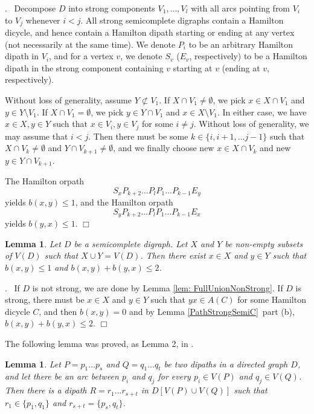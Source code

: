 \documentclass{article}
\newcommand{\2}{\vspace{2mm}}
\renewenvironment{proof}[1][]{\par \noindent {\bf Proof#1}.\ }{\hfill$\Box$
\par \vspace{11pt}}
\newtheorem{lemma}[theorem]{Lemma}
\theoremstyle{definition}
\begin{document}
\begin{proof}
Decompose $D$ into strong components $V_1,\dots,V_l$ with all arcs pointing from $V_i$ to $V_j$ whenever $i<j$. All strong semicomplete digraphs contain a Hamilton dicycle, and hence contain a Hamilton dipath starting or ending at any vertex (not necessarily at the same time). We denote $P_i$ to be an arbitrary Hamilton dipath in $V_i$, and for a vertex $v$, we denote $S_v$ ($E_v$, respectively) to be a Hamilton dipath in the strong component containing $v$ starting at $v$ (ending at $v$, respectively).

Without loss of generality, assume $Y \not\subset V_1$. If $X \cap V_1 \neq \emptyset$, we pick $x \in X \cap V_1$ and $y \in Y \setminus V_1$. If $X \cap V_1 = \emptyset$, we pick $y\in Y \cap V_1$ and $x \in X \setminus V_1$. In either case, we have $x \in X, y\in Y$ such that $x \in V_i, y \in V_j$ for some $i \neq j$.
Without loss of generality, we may assume that $i<j$. Then there must be some $k \in \{i,i+1,\dots j-1\}$ such that $X\cap V_k\ne \emptyset$ and $Y\cap V_{k+1}\ne \emptyset$, and we finally choose new $x\in X\cap V_k$ and new $y\in Y\cap V_{k+1}$.

The Hamilton orpath 
\[
S_{x}P_{k+2}\dots P_l P_1 \dots P_{k-1}E_y
\]
yields $b(x,y) \le 1$, and the Hamilton orpath
\[
S_{y}P_{k+2}\dots P_l P_1 \dots P_{k-1}E_x
\]
yields $b(y,x) \le 1$.
\end{proof}

\begin{lemma}\label{lem: FullUnion}
Let $D$ be a semicomplete digraph. Let $X$ and $Y$ be non-empty subsets of $V(D)$ such that $X \cup Y = V(D)$. Then there exist $x \in X$ and $y \in Y$ such that $b(x,y) \le 1$ and $b(x,y)+b(y,x) \le 2$.
\end{lemma}

\begin{proof}
If $D$ is not strong, we are done by Lemma \ref{lem: FullUnionNonStrong}.
If $D$ is strong, there must be $x \in X$ and $y \in Y$ such that $yx \in A(C)$ for some Hamilton dicycle $C$, and then $b(x,y) = 0$ and by Lemma \ref{PathStrongSemiC}~part (b), $b(x,y)+b(y,x) \le 2$.
\end{proof}

The following lemma was proved, as Lemma 2, in \cite{chen_manalastas_1983}.

\begin{lemma}\label{lem: PathCombine}
Let $P=p_1 \dots p_s$ and $Q=q_1\dots q_t$ be two dipaths in a directed graph $D$, and let there be an arc between $p_i$ and $q_j$ for every $p_i\in V(P)$ and $q_j\in V(Q)$.
Then there is a dipath $R=r_1 \dots r_{s+t}$ in $D[V(P) \cup V(Q)]$ such that $r_1\in \{p_1,q_1\}$ and $r_{s+t}=\{p_s,q_t\}$.   
\end{lemma}
\end{document}
